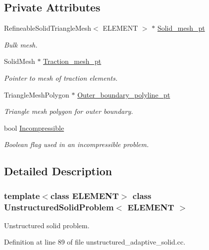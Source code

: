 \subsection*{Private Attributes}
\begin{DoxyCompactItemize}
\item 
Refineable\+Solid\+Triangle\+Mesh$<$ E\+L\+E\+M\+E\+NT $>$ $\ast$ \hyperlink{classUnstructuredSolidProblem_af121067bd532a78b4360373b60aaddd0}{Solid\+\_\+mesh\+\_\+pt}
\begin{DoxyCompactList}\small\item\em Bulk mesh. \end{DoxyCompactList}\item 
Solid\+Mesh $\ast$ \hyperlink{classUnstructuredSolidProblem_a42018e62ce6bf48968f389880669c8f4}{Traction\+\_\+mesh\+\_\+pt}
\begin{DoxyCompactList}\small\item\em Pointer to mesh of traction elements. \end{DoxyCompactList}\item 
Triangle\+Mesh\+Polygon $\ast$ \hyperlink{classUnstructuredSolidProblem_a2e7ef7b4984d6d2a063c0c2374931d0c}{Outer\+\_\+boundary\+\_\+polyline\+\_\+pt}
\begin{DoxyCompactList}\small\item\em Triangle mesh polygon for outer boundary. \end{DoxyCompactList}\item 
bool \hyperlink{classUnstructuredSolidProblem_a956386972054504cdc23fd970b126934}{Incompressible}
\begin{DoxyCompactList}\small\item\em Boolean flag used in an incompressible problem. \end{DoxyCompactList}\end{DoxyCompactItemize}


\subsection{Detailed Description}
\subsubsection*{template$<$class E\+L\+E\+M\+E\+NT$>$\newline
class Unstructured\+Solid\+Problem$<$ E\+L\+E\+M\+E\+N\+T $>$}

Unstructured solid problem. 

Definition at line 89 of file unstructured\+\_\+adaptive\+\_\+solid.\+cc.



